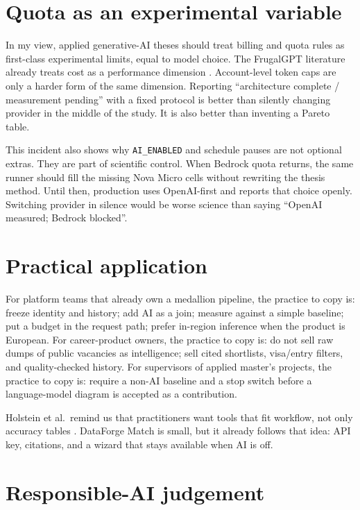 \section{Quota as an experimental variable}
\label{sec:quota}

In my view, applied generative-AI theses should treat billing and quota rules as first-class experimental limits, equal to model choice. The FrugalGPT literature already treats cost as a performance dimension . Account-level token caps are only a harder form of the same dimension. Reporting ``architecture complete / measurement pending'' with a fixed protocol is better than silently changing provider in the middle of the study. It is also better than inventing a Pareto table.

This incident also shows why \texttt{AI\_ENABLED} and schedule pauses are not optional extras. They are part of scientific control. When Bedrock quota returns, the same runner should fill the missing Nova Micro cells without rewriting the thesis method. Until then, production uses OpenAI-first and reports that choice openly. Switching provider in silence would be worse science than saying ``OpenAI measured; Bedrock blocked''.

\section{Practical application}
\label{sec:practical}

For platform teams that already own a medallion pipeline, the practice to copy is: freeze identity and history; add AI as a join; measure against a simple baseline; put a budget in the request path; prefer in-region inference when the product is European. For career-product owners, the practice to copy is: do not sell raw dumps of public vacancies as intelligence; sell cited shortlists, visa/entry filters, and quality-checked history. For supervisors of applied master's projects, the practice to copy is: require a non-AI baseline and a stop switch before a language-model diagram is accepted as a contribution.

Holstein et al.\ remind us that practitioners want tools that fit workflow, not only accuracy tables . DataForge Match is small, but it already follows that idea: API key, citations, and a wizard that stays available when AI is off.

\section{Responsible-AI judgement}
\label{sec:rai-discussion}

